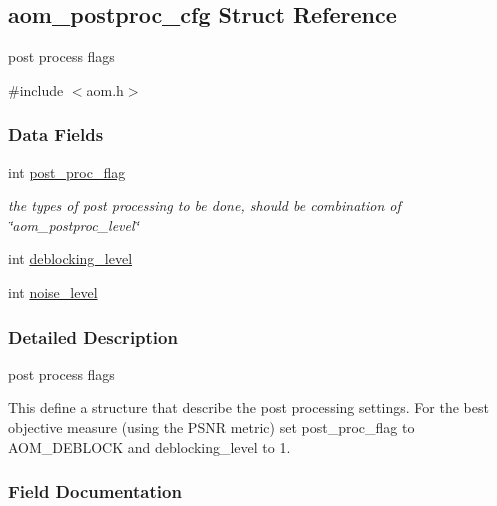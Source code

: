 \hypertarget{structaom__postproc__cfg}{}\subsection{aom\+\_\+postproc\+\_\+cfg Struct Reference}
\label{structaom__postproc__cfg}


post process flags  




{\ttfamily \#include $<$aom.\+h$>$}

\subsubsection*{Data Fields}
\begin{DoxyCompactItemize}
\item 
\mbox{\label{structaom__postproc__cfg_a47b934aabe66e2fd4ec2e95661a9d9fd}} 
int \hyperlink{structaom__postproc__cfg_a47b934aabe66e2fd4ec2e95661a9d9fd}{post\+\_\+proc\+\_\+flag}
\begin{DoxyCompactList}\small\item\em the types of post processing to be done, should be combination of \char`\"{}aom\+\_\+postproc\+\_\+level\char`\"{} \end{DoxyCompactList}\item 
int \hyperlink{structaom__postproc__cfg_ae1137e5688f978994e88b231c72b5a63}{deblocking\+\_\+level}
\item 
int \hyperlink{structaom__postproc__cfg_aa68fb341be4d3de6d4feb66d3b659c26}{noise\+\_\+level}
\end{DoxyCompactItemize}


\subsubsection{Detailed Description}
post process flags 

This define a structure that describe the post processing settings. For the best objective measure (using the P\+S\+NR metric) set post\+\_\+proc\+\_\+flag to A\+O\+M\+\_\+\+D\+E\+B\+L\+O\+CK and deblocking\+\_\+level to 1. 

\subsubsection{Field Documentation}
\mbox{\label{structaom__postproc__cfg_ae1137e5688f978994e88b231c72b5a63}} 
